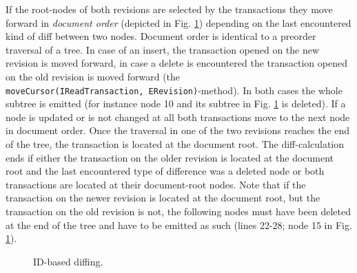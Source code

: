 If the root-nodes of both revisions are selected by the transactions they move forward in \emph{document order} (depicted in Fig. \ref{fig:id-diff}) depending on the last encountered kind of diff between two nodes. Document order is identical to a preorder traversal of a tree. In case of an insert, the transaction opened on the new revision is moved forward, in case a delete is encountered the transaction opened on the old revision is moved forward (the \\ \texttt{moveCursor(IReadTransaction, ERevision)}-method). In both cases the whole subtree is emitted (for instance node 10 and its subtree in Fig. \ref{fig:id-diff} is deleted). If a node is updated or is not changed at all both transactions move to the next node in document order. Once the traversal in one of the two revisions reaches the end of the tree, the transaction is located at the document root. The diff-calculation ends if either the transaction on the older revision is located at the document root and the last encountered type of difference was a deleted node or both transactions are located at their document-root nodes. Note that if the transaction on the newer revision is located at the document root, but the transaction on the old revision is not, the following nodes must have been deleted at the end of the tree and have to be emitted as such (lines 22-28; node 15 in Fig. \ref{fig:id-diff}). 

\begin{figure}[tb]
\caption{\label{fig:id-diff} ID-based diffing.}
\end{figure} 

